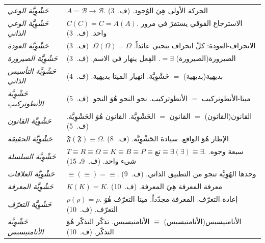 \documentclass[10pt, openany, oneside]{book}
\begin{document}
{\begin{tabular}{@{} p{} @{\hspace{0.5em}} p{} @{}}
\textit{حَشْوِيَّة الوعي} & $A = \mathcal{B} \to \mathcal{B}$. الحركة الأولى هِيَ الوُجود. (ف.\ 3) \\[0.3em]

\textit{حَشْوِيَّة الوعي الذاتي} & $C(C) = C = A(A)$. الاسترجاع الفوقي يستقرّ في مرور واحد. (ف.\ 3) \\[0.3em]

\textit{حَشْوِيَّة العودة} & الانجراف-العودة: كلّ انحراف ينحني عائداً. $\Omega(\Omega) = \Omega$. (ف.\ 3) \\[0.3em]

\textit{حَشْوِيَّة الصيرورة} & الصيرورة(الصيرورة) $= \exists$. الفِعل ينهار في الاسم. (ف.\ 3) \\[0.3em]

\textit{حَشْوِيَّة التأسيس الذاتي} & بديهية(بديهية) $=$ حَشْوِيَّة. انهيار الميتا-بديهية. (ف.\ 4) \\[0.3em]

\textit{حَشْوِيَّة الأنطوتركيب} & ميتا-الأنطوتركيب $=$ الأنطوتركيب. نحو النحو هُوَ النحو. (ف.\ 5) \\[0.3em]

\textit{حَشْوِيَّة القانون} & القانون(القانون) $=$ القانون $=$ الحَشْوِيَّة. القانون هُوَ الحَشْوِيَّة. (ف.\ 5) \\[0.3em]

\textit{حَشْوِيَّة الحقيقة} & $\mathfrak{F}(\mathfrak{F}) \equiv \Omega$. الإطار هُوَ الواقع. سيادة الحَشْوِيَّة. (ف.\ 8) \\[0.3em]

\textit{حَشْوِيَّة السلسلة} & $T \equiv R \equiv \Omega \equiv K \equiv B \equiv P \equiv \text{تع} \equiv \exists(\exists) \equiv \exists$. سبعة وجوه. شيء واحد. (ف.\ 9، 15) \\[0.3em]

\textit{حَشْوِيَّة العلاقات} & $\equiv(\equiv) = \equiv$. وحدها الهُوِيَّة تنجو من التطبيق الذاتي. (ف.\ 9) \\[0.3em]

\textit{حَشْوِيَّة المعرفة} & $K(K) = K$. معرفة المعرفة هِيَ المعرفة. (ف.\ 10) \\[0.3em]

\textit{حَشْوِيَّة التعرّف} & $\rho(\rho) = \rho$. إعادة-التعرّف: المعرفة-مجدّداً. ميتا-التعرّف هُوَ التعرّف. (ف.\ 10) \\[0.3em]

\textit{حَشْوِيَّة الأنامنيسيس} & الأنامنيسيس(الأنامنيسيس) $\equiv$ الأنامنيسيس. تذكّر التذكّر هُوَ التذكّر. (ف.\ 10) \\[0.3em]


\end{tabular}}
\end{document}

